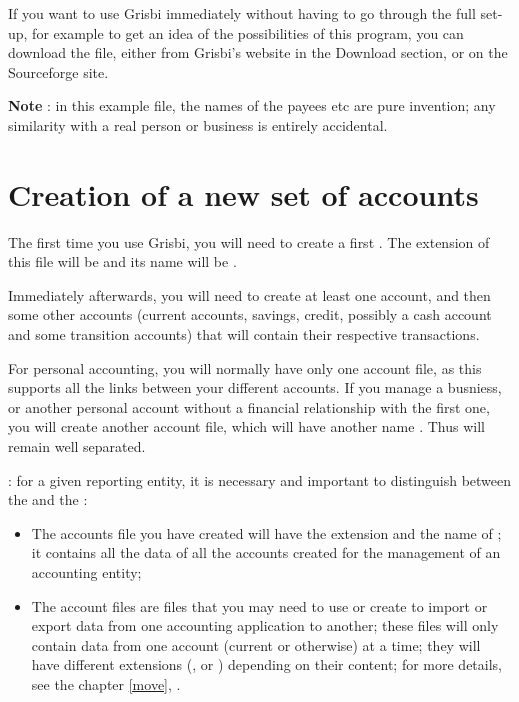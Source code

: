 If you want to use Grisbi immediately without having to go through the full set-up, for example to get an idea of the possibilities of this program, you can download the   file, either from Grisbi's website in the Download section{\siteGrisbiTelechargement}, or on the {Sourceforge}{\siteSourceForgeDocumentation} site.

\textbf{Note} : in this example file, the names of the payees etc are pure invention; any similarity with a real person or business is entirely accidental.

\section{Creation of a new set of accounts\label{start-newfile}}

The first time you use Grisbi, you will need to create a first
. The \gls{extension} of this file will be  and its name will be .

Immediately afterwards, you will need to create at least one account, and then some other accounts (current accounts, savings, credit, possibly a cash account and some transition accounts) that will contain their respective transactions.

For personal accounting, you will normally have only one account file, as this supports all the links between your different accounts. If you manage a busniess, or another personal account without a financial relationship with the first one, you will create another account file, which will have another name . Thus  will remain well separated.



: for a given reporting entity, it is necessary and important to distinguish between the  \og {}  \fg{} and the  \og {} \fg{}:
\begin{itemize}

\item The \og accounts file  \fg{} you have created will have the extension  and the name of ; it contains all the data of all the accounts created for the management of an accounting entity;

\item The \og account files  \fg{} are files that you may need to use or create to import or export data from one accounting application to another; these files will only contain data from one account (current or otherwise) at a time; they will have different extensions (,  or ) depending on their content; for more details, see the chapter \vref{move}, .
\end{itemize}

